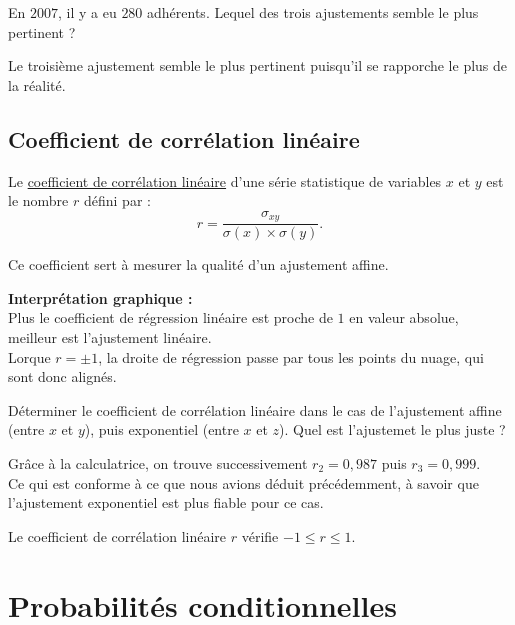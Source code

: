 \documentclass[french]{book}
\begin{document}
\begin{exemple}
   En $2007$, il y a eu $280$ adhérents. Lequel des trois ajustements semble le plus pertinent ?
\end{exemple}

Le troisième ajustement semble le plus pertinent puisqu'il se rapporche le plus de la réalité.

\section{Coefficient de corrélation linéaire}

\begin{defn}
   Le \underline{coefficient de corrélation linéaire} d'une série statistique de variables $x$ et $y$ est le nombre $r$ défini par :
   $$r=\frac{\sigma_{xy}}{\sigma(x)\times\sigma(y)}.$$
\end{defn}

Ce coefficient sert à mesurer la qualité d'un ajustement affine.


\textbf{Interprétation graphique :} \\
Plus le coefficient de régression linéaire est proche de $1$ en valeur absolue, meilleur est l'ajustement linéaire. \\
Lorque $r=\pm1$, la droite de régression passe par tous les points du nuage, qui sont donc alignés.


\begin{exemple}
   Déterminer le coefficient de corrélation linéaire dans le cas de l'ajustement affine (entre $x$ et $y$), puis exponentiel (entre $x$ et $z$). Quel est l'ajustemet le plus juste ?
\end{exemple}

Grâce à la calculatrice, on trouve successivement $r_2=0,987$ puis $r_3=0,999$. \\
Ce qui est conforme à ce que nous avions déduit précédemment, à savoir que l'ajustement exponentiel est plus fiable pour ce cas.



\begin{prop}
   Le  coefficient de corrélation linéaire $r$ vérifie $-1\leq r\leq 1$.
\end{prop}

\chapter{Probabilités conditionnelles}
\end{document}
